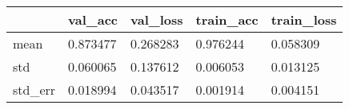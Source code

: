 \begin{tabular}{|l|l|l|l|l|}
\toprule \hline
 & val\_acc & val\_loss & train\_acc & train\_loss \\ \hline
\midrule
mean & 0.873477 & 0.268283 & 0.976244 & 0.058309 \\ \hline
std & 0.060065 & 0.137612 & 0.006053 & 0.013125 \\ \hline
std\_err & 0.018994 & 0.043517 & 0.001914 & 0.004151 \\ \hline
\bottomrule
\end{tabular}
